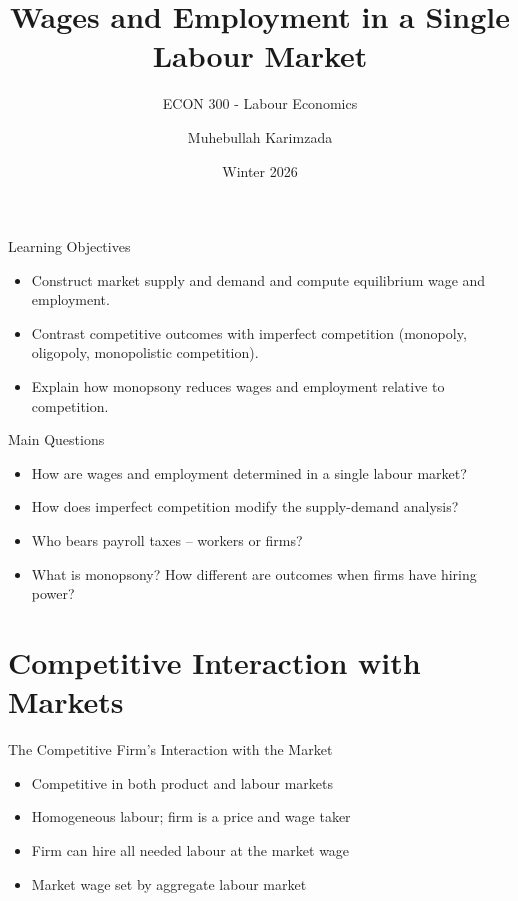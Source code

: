 \documentclass[aspectratio=169]{beamer}
\title{\textbf{Wages and Employment in a Single Labour Market\vspace{.5cm}\\  }}
\subtitle{ {\large ECON 300 - Labour Economics}}
\author{Muhebullah Karimzada}
\date{Winter 2026}
\begin{document}
\begin{frame}[plain]
  \titlepage

\end{frame}


\begin{frame}{Learning Objectives}
\transfade
\begin{itemize}
  \item Construct market supply and demand and compute equilibrium wage and employment.
  \item Contrast competitive outcomes with imperfect competition (monopoly, oligopoly, monopolistic competition).
  \item Explain how monopsony reduces wages and employment relative to competition.

\end{itemize}
\end{frame}

\begin{frame}{Main Questions}
\transfade
\begin{itemize}
  \item How are wages and employment determined in a single labour market?
  \item How does imperfect competition modify the supply-demand analysis?
  \item Who bears payroll taxes -- workers or firms?
  \item What is monopsony? How different are outcomes when firms have hiring power?
\end{itemize}
\end{frame}



\section{Competitive Interaction with Markets}

\begin{frame}{The Competitive Firm’s Interaction with the Market}
\transfade
\begin{itemize}
  \item Competitive in both product and labour markets
  \item Homogeneous labour; firm is a price and wage taker
  \item Firm can hire all needed labour at the market wage
  \item Market wage set by aggregate labour market
\end{itemize}
\end{frame}
\end{document}
